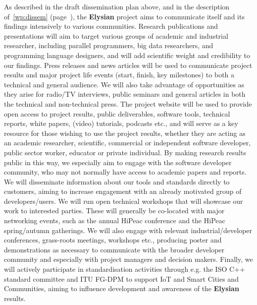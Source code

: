 \documentclass[a4paper,11pt]{article}
\newcommand{\project}[1]{\textbf{#1}\xspace}
\newcommand{\SECURITY}{\project{Elysian}}
\newcommand{\TheProject}{\SECURITY}
\begin{document}
As described in the draft dissemination plan above, and in the description of~\ref{wp:dissem} (page~\pageref{wp:dissem}),
the \TheProject{} project aims to communicate itself and its findings intensively to various communities.
Research publications and presentations will aim to target various groups of academic and industrial researcher,
including parallel programmers, big data researchers, and programming language
designers, and will add scientific weight and credibility to our findings.  Press releases and news articles will be used to communicate project results and major
project life events (start, finish, key milestones) to both a technical and general audience.
We will also take advantage of opportunities as they arise for radio/TV interviews, public seminars and general articles
in both the technical and non-technical press.
The project website will be used to provide open access to project results, public deliverables,
software tools, technical reports, white papers, (video) tutorials, podcasts etc., and will serve
as a key resource for those wishing to use the project results, whether they are acting as an academic researcher, scientific, commercial or independent
software developer, public sector worker,  educator or private individual.
By making research results public in this way, we especially aim to engage with the software developer
community, who may not normally have access to academic papers and reports.
We will disseminate information about our tools and standards directly to customers, aiming to
increase engagement with an already motivated group of developers/users.
We will run open technical workshops that will showcase our work to interested parties.
These will generally be co-located with major networking events, such as the annual HiPeac
conference and the HiPeac spring/autumn gatherings.
We will also engage with relevant industrial/developer conferences, grass-roots meetings, workshops etc.,
producing poster and demonstrations as necessary to communicate with the broader developer community
and especially with project managers and decision makers.
Finally, we will actively participate in standardisation activities through e.g. the ISO C++ standard committee and ITU FG-DPM to support IoT and Smart Cities and Communities,
aiming to influence development and awareness of the \TheProject{} results.

\clearpage

\end{document}
